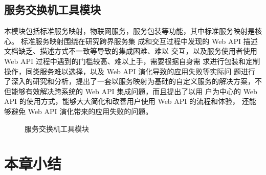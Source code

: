   \subsection{服务交换机工具模块}
  本模块包括标准服务映射，物联网服务，服务包装等功能，其中标准服务映射是核心。
  标准服务映射围绕在研究跨界服务集
  成和交互过程中发现的 Web API 描述文档缺乏、描述方式不一致等导致的集成困难、难以
  交互，以及服务使用者使用 Web API 过程中遇到的门槛较高、难以上手，需要根据自身需
  求进行包装和定制操作，同类服务难以选择，以及 Web API 演化导致的应用失败等实际问
  题进行了深入的研究和分析，提出了一套以服务映射为基础的自定义服务的解决方案，不但能够有效解决跨系统的 Web API 集成问题，而且提出了以用
  户为中心的 Web API 的使用方式，能够大大简化和改善用户使用 Web API 的流程和体验，
还能够避免 Web API 演化带来的应用失败的问题。
  \begin{figure}[htbp]
    \caption{服务交换机工具模块}
    \label{fig:fuwugongju}
    \end{figure}
\section{本章小结}